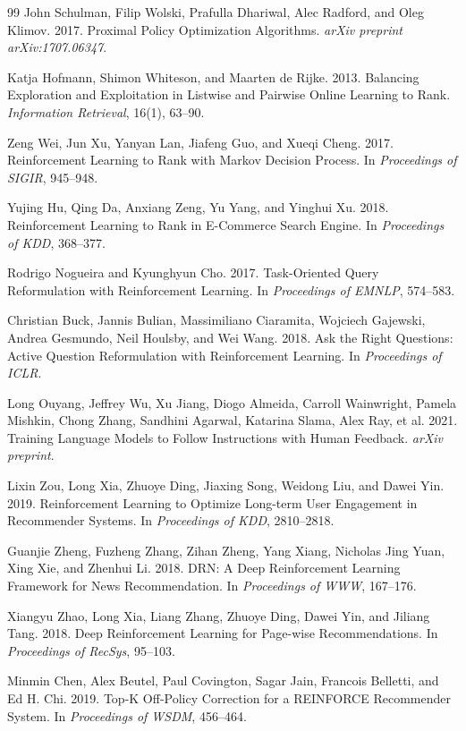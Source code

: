 \documentclass[sigconf]{acmart}
\begin{document}
\begin{thebibliography}{99}
John Schulman, Filip Wolski, Prafulla Dhariwal, Alec Radford, and Oleg Klimov. 2017. Proximal Policy Optimization Algorithms. \textit{arXiv preprint arXiv:1707.06347}.

Katja Hofmann, Shimon Whiteson, and Maarten de Rijke. 2013. Balancing Exploration and Exploitation in Listwise and Pairwise Online Learning to Rank. \textit{Information Retrieval}, 16(1), 63--90.

Zeng Wei, Jun Xu, Yanyan Lan, Jiafeng Guo, and Xueqi Cheng. 2017. Reinforcement Learning to Rank with Markov Decision Process. In \textit{Proceedings of SIGIR}, 945--948.

Yujing Hu, Qing Da, Anxiang Zeng, Yu Yang, and Yinghui Xu. 2018. Reinforcement Learning to Rank in E-Commerce Search Engine. In \textit{Proceedings of KDD}, 368--377.

Rodrigo Nogueira and Kyunghyun Cho. 2017. Task-Oriented Query Reformulation with Reinforcement Learning. In \textit{Proceedings of EMNLP}, 574--583.

Christian Buck, Jannis Bulian, Massimiliano Ciaramita, Wojciech Gajewski, Andrea Gesmundo, Neil Houlsby, and Wei Wang. 2018. Ask the Right Questions: Active Question Reformulation with Reinforcement Learning. In \textit{Proceedings of ICLR}.

Long Ouyang, Jeffrey Wu, Xu Jiang, Diogo Almeida, Carroll Wainwright, Pamela Mishkin, Chong Zhang, Sandhini Agarwal, Katarina Slama, Alex Ray, et al. 2021. Training Language Models to Follow Instructions with Human Feedback. \textit{arXiv preprint}.

Lixin Zou, Long Xia, Zhuoye Ding, Jiaxing Song, Weidong Liu, and Dawei Yin. 2019. Reinforcement Learning to Optimize Long-term User Engagement in Recommender Systems. In \textit{Proceedings of KDD}, 2810--2818.

Guanjie Zheng, Fuzheng Zhang, Zihan Zheng, Yang Xiang, Nicholas Jing Yuan, Xing Xie, and Zhenhui Li. 2018. DRN: A Deep Reinforcement Learning Framework for News Recommendation. In \textit{Proceedings of WWW}, 167--176.

Xiangyu Zhao, Long Xia, Liang Zhang, Zhuoye Ding, Dawei Yin, and Jiliang Tang. 2018. Deep Reinforcement Learning for Page-wise Recommendations. In \textit{Proceedings of RecSys}, 95--103.

Minmin Chen, Alex Beutel, Paul Covington, Sagar Jain, Francois Belletti, and Ed H. Chi. 2019. Top-K Off-Policy Correction for a REINFORCE Recommender System. In \textit{Proceedings of WSDM}, 456--464.


\end{thebibliography}
\end{document}
